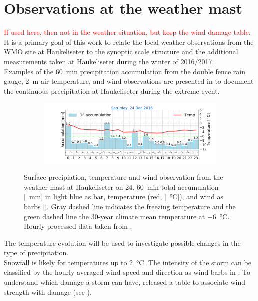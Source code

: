 \section{Observations at the weather mast}
\label{sec:loc_obs}
\textcolor{red}{If used here, then not in the weather situation, but keep the wind damage table.}
It is a primary goal of this work to relate the local weather observations from the WMO site at Haukeliseter to the synoptic scale structure and the additional measurements taken at Haukeliseter during the winter of 2016/2017.
\\
Examples of the \SI{60}{\minute} precipitation accumulation from the double fence rain gauge, \SI{2}{\metre} air temperature, and wind observations are presented in  to document the continuous precipitation at Haukeliseter during the extreme event. 
 \begin{figure}[ht!]
 	\centering
	\begin{subfigure}[b]{\textwidth}
		\includegraphics[trim={4.9cm 1.cm 1.5cm 1cm},clip,
		width=\textwidth]{./fig_weathermast/T_P_U_20161224}
		\caption{}\label{fig:TPU}
	\end{subfigure}
 \caption{Surface precipiation, temperature and wind observation from the weather mast at Haukeliseter on \SI{24}{\dec}. \SI{60}{\minute} total accumulation [\SI{}{\mm}] in light blue as bar, temperature (red, [\SI{}{\celsius}]), and wind as barbs [\SI{}{\mPs}]. Gray dashed line indicates the freezing temperature and the green dashed line the 30-year climate mean temperature at \SI{-6}{\celsius}. Hourly processed data taken from \cite{eklima_norwegian_2016}.} \label{fig:TPU}
 \end{figure}
\noindent
The temperature evolution will be used to investigate possible changes in the type of precipitation. 
\\
Snowfall is likely for temperatures up to \SI{2}{\celsius}. The intensity of the storm can be classified by the hourly averaged wind speed and direction as wind barbs in \SI{}{\mPs}.
To understand which damage a storm can have, \cite{faeraas_urd_2016} released a table to associate wind strength with damage (see ).
